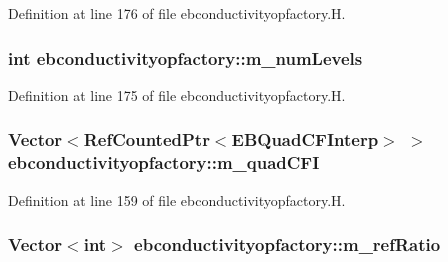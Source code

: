 Definition at line 176 of file ebconductivityopfactory.\+H.

\subsubsection[{\texorpdfstring{m\+\_\+num\+Levels}{m_numLevels}}]{\setlength{\rightskip}{0pt plus 5cm}int ebconductivityopfactory\+::m\+\_\+num\+Levels\hspace{0.3cm}{\ttfamily [protected]}}\hypertarget{classebconductivityopfactory_ac09d05c802f2612ef917c83290baa331}{}\label{classebconductivityopfactory_ac09d05c802f2612ef917c83290baa331}


Definition at line 175 of file ebconductivityopfactory.\+H.

\subsubsection[{\texorpdfstring{m\+\_\+quad\+C\+FI}{m_quadCFI}}]{\setlength{\rightskip}{0pt plus 5cm}Vector$<$Ref\+Counted\+Ptr$<$E\+B\+Quad\+C\+F\+Interp$>$ $>$ ebconductivityopfactory\+::m\+\_\+quad\+C\+FI\hspace{0.3cm}{\ttfamily [protected]}}\hypertarget{classebconductivityopfactory_a41977ee60489c87d03ed26a040869820}{}\label{classebconductivityopfactory_a41977ee60489c87d03ed26a040869820}


Definition at line 159 of file ebconductivityopfactory.\+H.

\subsubsection[{\texorpdfstring{m\+\_\+ref\+Ratio}{m_refRatio}}]{\setlength{\rightskip}{0pt plus 5cm}Vector$<$int$>$ ebconductivityopfactory\+::m\+\_\+ref\+Ratio\hspace{0.3cm}{\ttfamily [protected]}}\hypertarget{classebconductivityopfactory_a0de01e8b37fa846cbdc45d5caa923438}{}\label{classebconductivityopfactory_a0de01e8b37fa846cbdc45d5caa923438}


